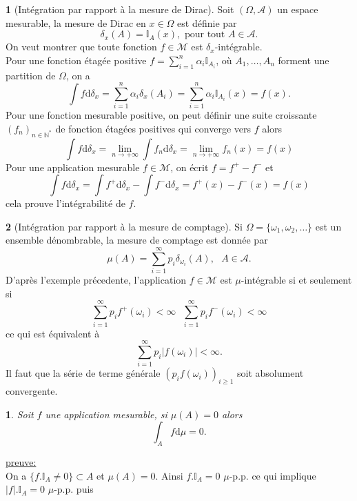 \documentclass[8pt,notheorems]{beamer}
\def \N{\mathbb N}
\newtheorem{prop}{\translate{Proposition}}
\theoremstyle{definition}
\theoremstyle{example}
\newtheorem{example}{\translate{Exemple}}
\theoremstyle{mystyle}
\theoremstyle{plain}
\begin{document}
\begin{frame}[allowframebreaks]
\begin{example}[Intégration par rapport à la mesure de Dirac]
Soit $(\Omega, \mathcal{A})$ un espace mesurable, la mesure de Dirac en $x\in \Omega$ est définie par 
$$
\delta_x(A) = \mathbb{I}_A(x),\text{ pour tout }A\in \mathcal{A}. 
$$
On veut montrer que toute fonction $f\in \mathcal{M}$ est $\delta_x$-intégrable.\\ 
Pour une fonction étagée positive $f = \sum_{i = 1}^{n}\alpha_i\mathbb{I}_{A_i}$, où $A_1,\ldots, A_n$ forment une partition de $\Omega$, on a 
$$
\int f\text{d}\delta_x = \sum_{i = 1}^{n}\alpha_i\delta_x(A_i)  =  \sum_{i = 1}^{n}\alpha_i\mathbb{I}_{A_i}(x) = f(x).
$$
Pour une fonction mesurable positive, on peut définir une suite croissante $(f_n)_{n\in\N^\ast}$ de fonction étagées positives qui converge vers $f$ alors 
$$
\int f\text{d}\delta_x = \underset{n\rightarrow +\infty}{\lim}\int f_n\text{d}\delta_x  =  \underset{n\rightarrow +\infty}{\lim}f_n(x) = f(x)
$$
Pour une application mesurable $f\in \mathcal{M}$, on écrit $f = f^+-f^-$ et 
$$
\int f\text{d}\delta_x = \int f^+\text{d}\delta_x -\int f^-\text{d}\delta_x = f^+(x)-f^-(x) = f(x)
$$
cela prouve l'intégrabilité de $f$.
\end{example}
\begin{example}[Intégration par rapport à la mesure de comptage]
Si $\Omega = \{\omega_1,\omega_2,\ldots\}$ est un ensemble dénombrable, la mesure de comptage est donnée par 
$$
\mu(A) = \sum_{i = 1}^\infty p_i\delta_{\omega_i}(A),\text{ }A\in \mathcal{A}.
$$
D'après l'exemple précedente, l'application $f\in \mathcal{M}$ est $\mu$-intégrable si et seulement si 
$$
\sum_{i = 1}^{\infty}p_i f^+(\omega_i)<\infty\text{ }\sum_{i = 1}^{\infty}p_i f^-(\omega_i)<\infty
$$
ce qui est équivalent à 
$$
\sum_{i = 1}^{\infty}p_i|f(\omega_i)|<\infty.
$$
Il faut que la série de terme générale $(p_i f(\omega_i))_{i\geq1}$ soit absolument convergente.
\end{example}
\begin{prop}\label{prop:integrale_ensemble_mesure_nulle}
Soit $f$ une application mesurable, si $\mu(A) = 0$ alors 
$$
\int_A f\text{d}\mu = 0.
$$
\end{prop}
\underline{preuve:}\\
On a $\{f.\mathbb{I}_A\neq 0\}\subset A$ et $\mu(A) = 0$. Ainsi $f.\mathbb{I}_A=0$ $\mu$-p.p. ce qui implique $|f|.\mathbb{I}_A=0$ $\mu$-p.p. puis 

\end{frame}
\end{document}
